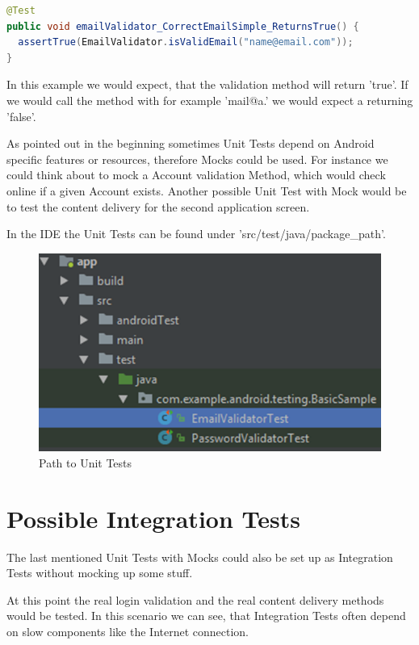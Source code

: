 	\begin{lstlisting}[language=Java]
@Test
public void emailValidator_CorrectEmailSimple_ReturnsTrue() {
  assertTrue(EmailValidator.isValidEmail("name@email.com"));
}
	\end{lstlisting}
	In this example we would expect, that the validation method will return 'true'. If we would call the method with for example 'mail@a.' we would expect a returning 'false'.
	
	As pointed out in the beginning sometimes Unit Tests depend on Android specific features or resources, therefore Mocks could be used. For instance we could think about to mock a Account validation Method, which would check online if a given Account exists. Another possible Unit Test with Mock would be to test the content delivery for the second application screen.
		
	In the IDE the Unit Tests can be found under 'src/test/java/package\_path'.
	\begin{figure}[H]
		\centering
		\includegraphics[width=0.5\linewidth]{images/unit_tests_folder}
		\caption{Path to Unit Tests}
		\label{fig:unittestsfolder}
	\end{figure}	
	
	\section{Possible Integration Tests}
	The last mentioned Unit Tests with Mocks could also be set up as Integration Tests without mocking up some stuff.
	
	At this point the real login validation and the real content delivery methods would be tested. In this scenario we can see, that Integration Tests often depend on slow components like the Internet connection.
	
